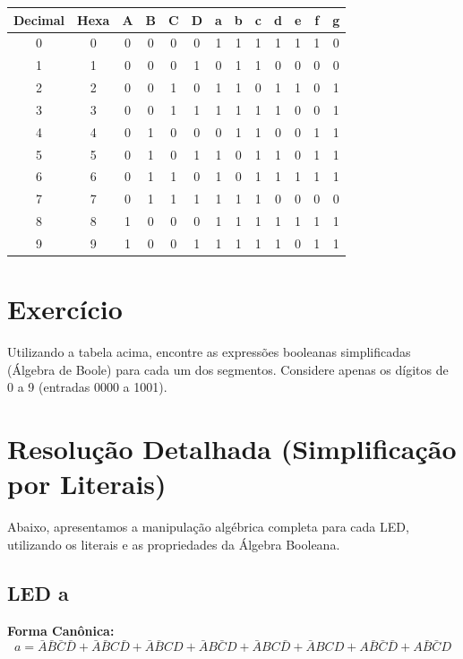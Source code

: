 \documentclass[12pt]{article}
\begin{document}
\begin{center}
\renewcommand{\arraystretch}{1.3}
\begin{tabular}{|c|c|cccc|ccccccc|}
\hline
\textbf{Decimal} & \textbf{Hexa} & \textbf{A} & \textbf{B} & \textbf{C} & \textbf{D} & \textbf{a} & \textbf{b} & \textbf{c} & \textbf{d} & \textbf{e} & \textbf{f} & \textbf{g} \\ \hline
0 & 0 & 0 & 0 & 0 & 0 & 1 & 1 & 1 & 1 & 1 & 1 & 0 \\ \hline
1 & 1 & 0 & 0 & 0 & 1 & 0 & 1 & 1 & 0 & 0 & 0 & 0 \\ \hline
2 & 2 & 0 & 0 & 1 & 0 & 1 & 1 & 0 & 1 & 1 & 0 & 1 \\ \hline
3 & 3 & 0 & 0 & 1 & 1 & 1 & 1 & 1 & 1 & 0 & 0 & 1 \\ \hline
4 & 4 & 0 & 1 & 0 & 0 & 0 & 1 & 1 & 0 & 0 & 1 & 1 \\ \hline
5 & 5 & 0 & 1 & 0 & 1 & 1 & 0 & 1 & 1 & 0 & 1 & 1 \\ \hline
6 & 6 & 0 & 1 & 1 & 0 & 1 & 0 & 1 & 1 & 1 & 1 & 1 \\ \hline
7 & 7 & 0 & 1 & 1 & 1 & 1 & 1 & 1 & 0 & 0 & 0 & 0 \\ \hline
8 & 8 & 1 & 0 & 0 & 0 & 1 & 1 & 1 & 1 & 1 & 1 & 1 \\ \hline
9 & 9 & 1 & 0 & 0 & 1 & 1 & 1 & 1 & 1 & 0 & 1 & 1 \\ \hline
\end{tabular}
\end{center}

\vspace{0.5cm}

\section*{Exercício}

Utilizando a tabela acima, encontre as expressões booleanas simplificadas (Álgebra de Boole) para cada um dos segmentos. Considere apenas os dígitos de 0 a 9 (entradas 0000 a 1001).

\newpage

\section*{Resolução Detalhada (Simplificação por Literais)}

Abaixo, apresentamos a manipulação algébrica completa para cada LED, utilizando os literais e as propriedades da Álgebra Booleana.

\subsection*{LED \textbf{a}}
\textbf{Forma Canônica:}
\[ a = \bar{A}\bar{B}\bar{C}\bar{D} + \bar{A}\bar{B}C\bar{D} + \bar{A}\bar{B}CD + \bar{A}B\bar{C}D + \bar{A}BC\bar{D} + \bar{A}BCD + A\bar{B}\bar{C}\bar{D} + A\bar{B}\bar{C}D \]
\end{document}
